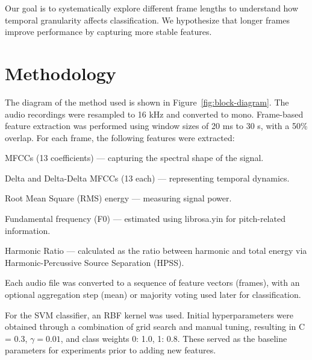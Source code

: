 \documentclass[conference]{IEEEtran}
\begin{document}
Our goal is to systematically explore different frame lengths to understand how temporal granularity affects classification. We hypothesize that longer frames improve performance by capturing more stable features.

\section{Methodology}

The diagram of the method used is shown in Figure~\ref{fig:block-diagram}.
The audio recordings were resampled to 16 kHz and converted to mono. 
Frame-based feature extraction was performed using window sizes of 20 ms to 30 s, with a 50\% overlap. 
For each frame, the following features were extracted:

MFCCs (13 coefficients) — capturing the spectral shape of the signal.

Delta and Delta-Delta MFCCs (13 each) — representing temporal dynamics.

Root Mean Square (RMS) energy — measuring signal power.

Fundamental frequency (F0) — estimated using librosa.yin for pitch-related information.

Harmonic Ratio — calculated as the ratio between harmonic and total energy via Harmonic-Percussive Source Separation (HPSS).

Each audio file was converted to a sequence of feature vectors (frames), with an optional aggregation step (mean) or majority voting used later for classification.

For the SVM classifier, an RBF kernel was used. 
Initial hyperparameters were obtained through a combination of grid search and manual tuning, resulting in C = 0.3, $\gamma = 0.01$, and class weights {0: 1.0, 1: 0.8}. 
These served as the baseline parameters for experiments prior to adding new features.
\end{document}
